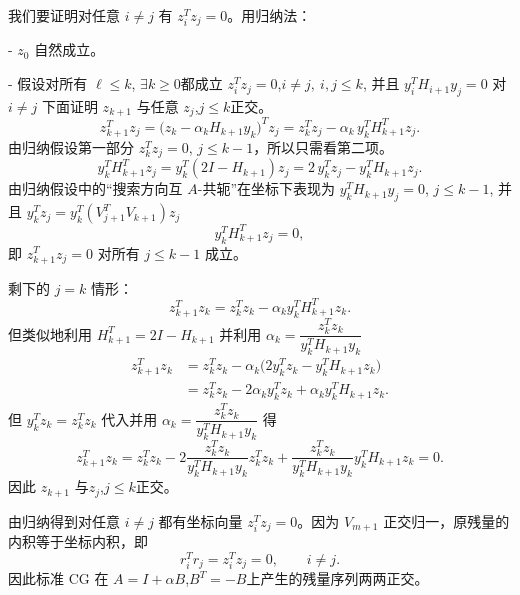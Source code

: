 \documentclass{ctexart}
\begin{document}
\begin{solution}
\begin{enumerate}
      我们要证明对任意 \(i\ne j\) 有 \(z_i^T z_j=0\)。用归纳法：

      - \(z_0\) 自然成立。

      - 假设对所有 \(\ell\le k\), \(\exists k\ge0\)都成立 \(z_i^T z_j=0\),\(i\ne j, \ i,j\le k\),
      并且 \(y_i^T H_{i+1} y_j = 0\) 对 \(i\ne j\)
      下面证明 \(z_{k+1}\) 与任意 \(z_j\),\(j\le k\)正交。
      \[
        z_{k+1}^T z_j = \bigl(z_k - \alpha_k H_{k+1} y_k\bigr)^T z_j
        = z_k^T z_j - \alpha_k\, y_k^T H_{k+1}^T z_j.
      \]
      由归纳假设第一部分 \(z_k^T z_j=0\), \(j\le k-1\)，所以只需看第二项。
      \[
        y_k^T H_{k+1}^T z_j = y_k^T(2I - H_{k+1}) z_j
        = 2\, y_k^T z_j - y_k^T H_{k+1} z_j.
      \]
      由归纳假设中的“搜索方向互 \(A\)-共轭”在坐标下表现为 \(y_k^T H_{k+1} y_j = 0\), \(j\le k-1\),
      并且 \(y_k^T z_j = y_k^T(V_{j+1}^T V_{k+1}) z_j\)
      \[
        y_k^T H_{k+1}^T z_j = 0,
      \]
      即 \(z_{k+1}^T z_j = 0\) 对所有 \(j\le k-1\) 成立。

      剩下的 \(j=k\) 情形：
      \[
        z_{k+1}^T z_k = z_k^T z_k - \alpha_k y_k^T H_{k+1}^T z_k.
      \]
      但类似地利用 \(H_{k+1}^T=2I-H_{k+1}\) 并利用 \(\alpha_k=\dfrac{z_k^T z_k}{y_k^T H_{k+1} y_k}\)
      \[
        \begin{aligned}
          z_{k+1}^T z_k
          &= z_k^T z_k - \alpha_k\bigl(2y_k^T z_k - y_k^T H_{k+1} z_k\bigr) \\
          &= z_k^T z_k - 2\alpha_k y_k^T z_k + \alpha_k y_k^T H_{k+1} z_k.
        \end{aligned}
      \]
      但 \(y_k^T z_k = z_k^T z_k\)
      代入并用 \(\alpha_k=\dfrac{z_k^T z_k}{y_k^T H_{k+1} y_k}\) 得
      \[
        z_{k+1}^T z_k = z_k^T z_k - 2\frac{z_k^T z_k}{y_k^T H_{k+1} y_k} z_k^T z_k + \frac{z_k^T z_k}{y_k^T H_{k+1} y_k} y_k^T H_{k+1} z_k = 0.
      \]
      因此 \(z_{k+1}\) 与\(z_j\),\(j\le k\)正交。

      由归纳得到对任意 \(i\ne j\) 都有坐标向量 \(z_i^T z_j=0\)。因为 \(V_{m+1}\) 正交归一，原残量的内积等于坐标内积，即
      \[
        r_i^T r_j = z_i^T z_j = 0,\qquad i\ne j.
      \]
      因此标准 CG 在 \(A=I+\alpha B\),$B^T=-B$上产生的残量序列两两正交。

  \end{enumerate}
\end{solution}
\end{document}
